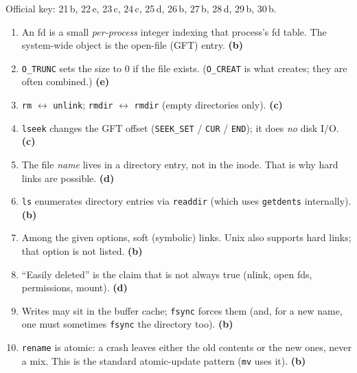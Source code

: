 \documentclass[11pt,a4paper]{article}
\newenvironment{Sol}{%
  \begin{tcolorbox}[sboxstyle, title={Solution}]%
}{%
  \end{tcolorbox}\vspace{0.35em}%
}
\begin{document}
\begin{Sol}
Official key: 21\,b, 22\,e, 23\,c, 24\,c, 25\,d, 26\,b, 27\,b, 28\,d,
29\,b, 30\,b.
\begin{enumerate}[(21)]
\item An fd is a small \emph{per-process} integer indexing that
      process's fd table. The system-wide object is the open-file
      (GFT) entry. \textbf{(b)}
\item \texttt{O\_TRUNC} sets the size to 0 if the file exists.
      (\texttt{O\_CREAT} is what creates; they are often combined.)
      \textbf{(e)}
\item \texttt{rm} $\leftrightarrow$ \texttt{unlink}; \texttt{rmdir}
      $\leftrightarrow$ \texttt{rmdir} (empty directories only).
      \textbf{(c)}
\item \texttt{lseek} changes the GFT offset (\texttt{SEEK\_SET} /
      \texttt{CUR} / \texttt{END}); it does \emph{no} disk I/O.
      \textbf{(c)}
\item The file \emph{name} lives in a directory entry, not in the
      inode. That is why hard links are possible. \textbf{(d)}
\item \texttt{ls} enumerates directory entries via
      \texttt{readdir} (which uses \texttt{getdents} internally).
      \textbf{(b)}
\item Among the given options, soft (symbolic) links. Unix also
      supports hard links; that option is not listed. \textbf{(b)}
\item ``Easily deleted'' is the claim that is not always true
      (nlink, open fds, permissions, mount). \textbf{(d)}
\item Writes may sit in the buffer cache; \texttt{fsync} forces them
      (and, for a new name, one must sometimes \texttt{fsync} the
      directory too). \textbf{(b)}
\item \texttt{rename} is atomic: a crash leaves either the old
      contents or the new ones, never a mix. This is the standard
      atomic-update pattern (\texttt{mv} uses it). \textbf{(b)}
\end{enumerate}
\end{Sol}
\end{document}
